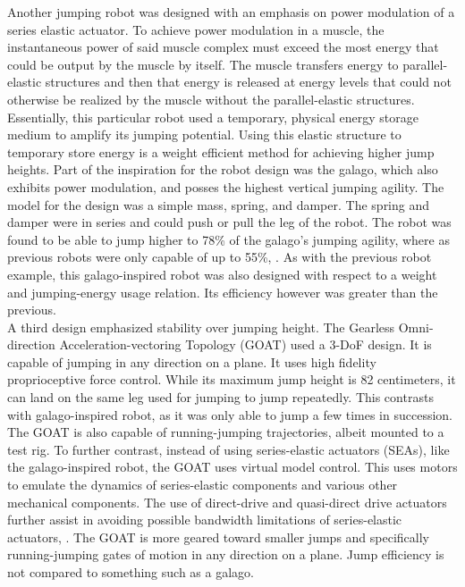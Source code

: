 \indent Another jumping robot was designed with an emphasis on power modulation of a series elastic actuator. To achieve power modulation in a muscle, the instantaneous power of said muscle complex must exceed the most energy that could be output by the muscle by itself. The muscle transfers energy to parallel-elastic structures and then that energy is released at energy levels that could not otherwise be realized by the muscle without the parallel-elastic structures. Essentially, this particular robot used a temporary, physical energy storage medium to amplify its jumping potential. Using this elastic structure to temporary store energy is a weight efficient method for achieving higher jump heights. Part of the inspiration for the robot design was the galago, which also exhibits power modulation, and posses the highest vertical jumping agility. The model for the design was a simple mass, spring, and damper. The spring and damper were in series and could push or pull the leg of the robot. The robot was found to be able to jump higher to 78\% of the galago's jumping agility, where as previous robots were only capable of up to 55\%, \cite{haldane_robotic_2016}. As with the previous robot example, this galago-inspired robot was also designed with respect to a weight and jumping-energy usage relation. Its efficiency however was greater than the previous.\\
\indent A third design emphasized stability over jumping height. The Gearless Omni-direction Acceleration-vectoring Topology (GOAT) used a 3-DoF design. It is capable of jumping in any direction on a plane. It uses high fidelity proprioceptive force control. While its maximum jump height is 82 centimeters, it can land on the same leg used for jumping to jump repeatedly. This contrasts with galago-inspired robot, as it was only able to jump a few times in succession. The GOAT is also capable of running-jumping trajectories, albeit mounted to a test rig. To further contrast, instead of using series-elastic actuators (SEAs), like the galago-inspired robot, the GOAT uses virtual model control. This uses motors to emulate the dynamics of series-elastic components and various other mechanical components. The use of direct-drive and quasi-direct drive actuators further assist in avoiding possible bandwidth limitations of series-elastic actuators, \cite{kalouche_goat:_2017}. The GOAT is more geared toward smaller jumps and specifically running-jumping gates of motion in any direction on a plane. Jump efficiency is not compared to something such as a galago.\\
